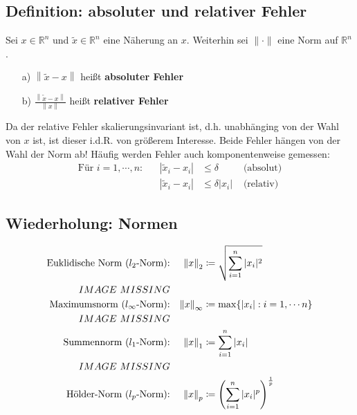 \documentclass[ngerman,fontsize=11pt, paper=a4, parskip=half, titlepage=true, toc=bib]{scrbook}
\newcommand{\R}{\mathds{R}}
\newcommand{\nn}[1]{\left\| #1 \right\|}
\begin{document}
\subsection{Definition: absoluter und relativer Fehler} \label{3.2.2} 
Sei $x\in\R^n$ und $\widetilde{x} \in \R^n$ eine Näherung an $x$. Weiterhin sei $\|\cdot\|$ eine Norm auf $\R^n$.
\begin{itemize}
	\item[a)] $\nn{\widetilde{x} - x}$ heißt \textbf{absoluter Fehler} 
	\item[b)] $\frac{\nn{\widetilde{x} - x}}{\nn{x}}$ heißt \textbf{relativer Fehler}
\end{itemize}
Da der relative Fehler skalierungsinvariant ist, d.h. unabhänging von der  Wahl von $x$ ist, ist dieser i.d.R. von größerem Interesse.
Beide Fehler hängen von der Wahl der Norm ab!
Häufig werden Fehler auch komponentenweise gemessen:
\begin{align*}
	\text{Für } i=1,\cdots , n : && |\widetilde{x}_i - x_i | & \leq \delta & \text{ (absolut)} \\
											 && |\widetilde{x}_i - x_i | &\leq \delta |x_i| & \text{ (relativ)}
\end{align*}

\subsection{Wiederholung: Normen} \label{3.2.3}

\begin{align*}
	\text{Euklidische Norm ($l_2$-Norm):} &&	\nn{x}_2 &\coloneqq \sqrt{\sum_{i=1}^{n}|x_i|^2}
		\index{Norm!Euklidische Norm} \\
			IMAGE~MISSING \\
	\text{Maximumsnorm ($l_\infty$-Norm):} &&\nn{x}_\infty &\coloneqq \max\{|x_i| : i=1, \cdots n\} \\
	  	\index{Norm!Maximumsnorm}
		  	IMAGE~MISSING \\
	\text{Summennorm ($l_1$-Norm):} &&	\nn{x}_1 &\coloneqq \sum_{i=1}^{n}|x_i| 
		\index{Norm!Summennorm}\\
			IMAGE~MISSING \\
	\text{Hölder-Norm ($l_p$-Norm):} &&	\nn{x}_p &\coloneqq 
		\left(\sum_{i=1}^{n}|x_i|^p\right)^{\frac{1}{p}} 
		\index{Norm!Hölder-Norm}
\end{align*}
\end{document}
